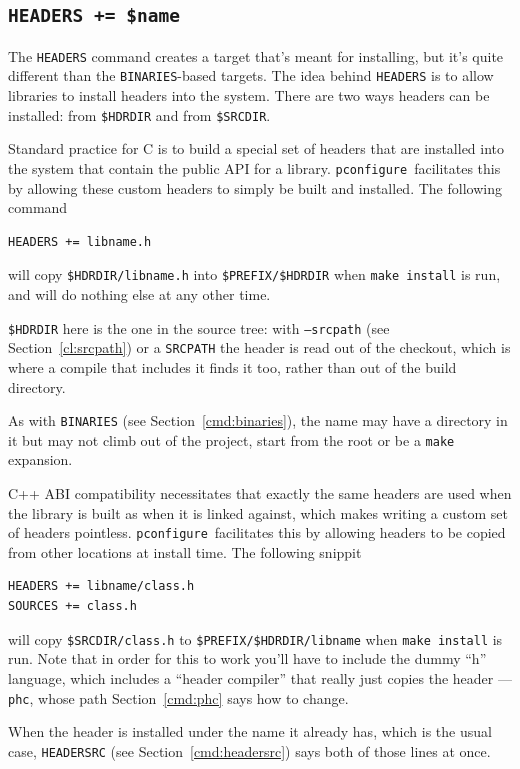 \documentclass{article}
\newcommand{\pconfigure}{\texttt{pconfigure}}
\begin{document}
\subsection{\texttt{HEADERS += \$name} \label{cmd:headers}}

The \texttt{HEADERS} command creates a target that's meant for
installing, but it's quite different than the \texttt{BINARIES}-based
targets.  The idea behind \texttt{HEADERS} is to allow libraries to
install headers into the system.  There are two ways headers can be
installed: from \texttt{\$HDRDIR} and from \texttt{\$SRCDIR}.

Standard practice for C is to build a special set of headers that are
installed into the system that contain the public API for a library.
\pconfigure\ facilitates this by allowing these custom headers to
simply be built and installed.  The following command
\begin{verbatim}
HEADERS += libname.h
\end{verbatim}
will copy \texttt{\$HDRDIR/libname.h} into \texttt{\$PREFIX/\$HDRDIR}
when \texttt{make install} is run, and will do nothing else at any
other time.

\texttt{\$HDRDIR} here is the one in the source tree: with
\texttt{--srcpath} (see Section~\ref{cl:srcpath}) or a
\texttt{SRCPATH} the header is read out of the checkout, which is
where a compile that includes it finds it too, rather than out of the
build directory.

As with \texttt{BINARIES} (see Section~\ref{cmd:binaries}), the name
may have a directory in it but may not climb out of the project, start
from the root or be a \texttt{make} expansion.

C++ ABI compatibility necessitates that exactly the same headers are
used when the library is built as when it is linked against, which
makes writing a custom set of headers pointless.
\pconfigure\ facilitates this by allowing headers to be copied from
other locations at install time.  The following snippit
\begin{verbatim}
HEADERS += libname/class.h
SOURCES += class.h
\end{verbatim}
will copy \texttt{\$SRCDIR/class.h} to
\texttt{\$PREFIX/\$HDRDIR/libname} when \texttt{make install} is run.
Note that in order for this to work you'll have to include the dummy
``h'' language, which includes a ``header compiler'' that really just
copies the header --- \texttt{phc}, whose path
Section~\ref{cmd:phc} says how to change.

When the header is installed under the name it already has, which is
the usual case, \texttt{HEADERSRC} (see Section~\ref{cmd:headersrc})
says both of those lines at once.
\end{document}
